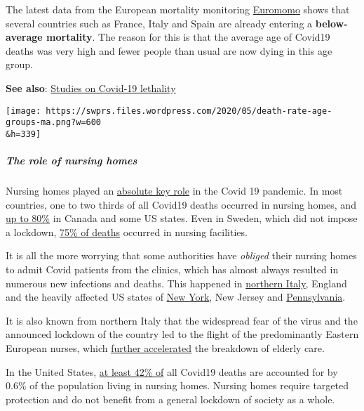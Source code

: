 The latest data from the European mortality monitoring
\href{https://www.euromomo.eu/graphs-and-maps/}{Euromomo} shows that
several countries such as France, Italy and Spain are already entering a
\textbf{below-average mortality}. The reason for this is that the
average age of Covid19 deaths was very high and fewer people than usual
are now dying in this age group.

\textbf{See also}:
\href{https://swprs.org/studies-on-covid-19-lethality/}{Studies on
Covid-19 lethality}

\texttt{[image: https://swprs.files.wordpress.com/2020/05/death-rate-age-groups-ma.png?w=600\\\&h=339]}

\hypertarget{the-role-of-nursing-homes}{%
\subparagraph{\texorpdfstring{\textbf{The role of nursing
homes}}{The role of nursing homes}}\label{the-role-of-nursing-homes}}

Nursing homes played an
\href{https://ltccovid.org/2020/04/12/mortality-associated-with-covid-19-outbreaks-in-care-homes-early-international-evidence/}{absolute
key role} in the Covid 19 pandemic. In most countries, one to two thirds
of all Covid19 deaths occurred in nursing homes, and
\href{https://freopp.org/the-covid-19-nursing-home-crisis-by-the-numbers-3a47433c3f70}{up
to 80\%} in Canada and some US states. Even in Sweden, which did not
impose a lockdown,
\href{https://www.thelocal.se/20200525/swedish-death-toll-passes-4000-as-coronavirus-cases-in-care-homes-start-to-fall}{75\%
of deaths} occurred in nursing facilities.

It is all the more worrying that some authorities have \emph{obliged}
their nursing homes to admit Covid patients from the clinics, which has
almost always resulted in numerous new infections and deaths. This
happened in
\href{https://www.trtworld.com/magazine/the-massacre-of-italy-s-elderly-nursing-home-residents-35575}{northern
Italy}, England and the heavily affected US states of
\href{https://nypost.com/2020/05/12/calls-for-independent-probe-of-gov-cuomos-nursing-home-policies/}{New
York}, New Jersey and
\href{https://nypost.com/2020/05/13/pennsylvania-health-official-moved-mother-from-nursing-home/}{Pennsylvania}.

It is also known from northern Italy that the widespread fear of the
virus and the announced lockdown of the country led to the flight of the
predominantly Eastern European nurses, which
\href{https://swprs.org/covid-19-a-report-from-italy/}{further
accelerated} the breakdown of elderly care.

In the United States,
\href{https://www.forbes.com/sites/theapothecary/2020/05/26/nursing-homes-assisted-living-facilities-0-6-of-the-u-s-population-43-of-u-s-covid-19-deaths/}{at
least 42\% of} all Covid19 deaths are accounted for by 0.6\% of the
population living in nursing homes. Nursing homes require targeted
protection and do not benefit from a general lockdown of society as a
whole.


